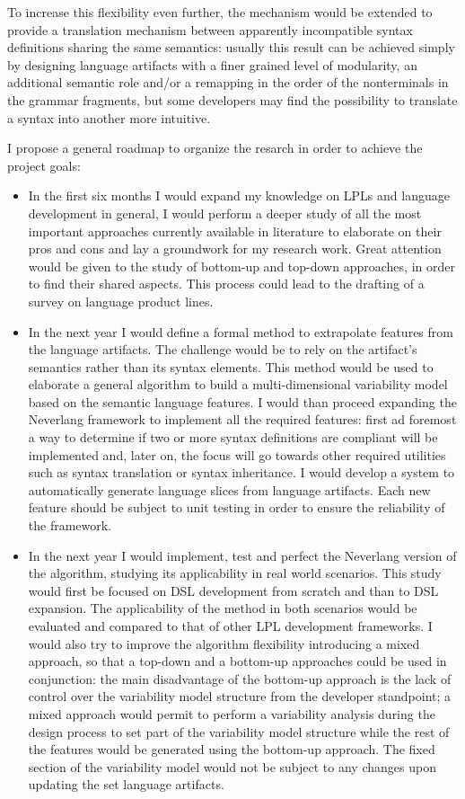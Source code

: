 To increase this flexibility even further, the mechanism would be extended to provide a translation mechanism between apparently incompatible syntax definitions sharing the same semantics: usually this result can be achieved simply by designing language artifacts with a finer grained level of modularity, an additional semantic role and/or a remapping in the order of the nonterminals in the grammar fragments, but some developers may find the possibility to translate a syntax into another more intuitive.

I propose a general roadmap to organize the resarch in order to achieve the project goals:
\begin{itemize}
    \item In the first six months I would expand my knowledge on LPLs and language development in general, I would perform a deeper study of all the most important approaches currently available in literature to elaborate on their pros and cons and lay a groundwork for my research work. Great attention would be given to the study of bottom-up and top-down approaches, in order to find their shared aspects. This process could lead to the drafting of a survey on language product lines.
    \item In the next year I would define a formal method to extrapolate features from the language artifacts. The challenge would be to rely on the artifact's semantics rather than its syntax elements. This method would be used to elaborate a general algorithm to build a multi-dimensional variability model based on the semantic language features. I would than proceed expanding the Neverlang framework to implement all the required features: first ad foremost a way to determine if two or more syntax definitions are compliant will be implemented and, later on, the focus will go towards other required utilities such as syntax translation or syntax inheritance. I would develop a system to automatically generate language slices from language artifacts. Each new feature should be subject to unit testing in order to ensure the reliability of the framework.
    \item In the next year I would implement, test and perfect the Neverlang version of the algorithm, studying its applicability in real world scenarios. This study would first be focused on DSL development from scratch and than to DSL expansion. The applicability of the method in both scenarios would be evaluated and compared to that of other LPL development frameworks. I would also try to improve the algorithm flexibility introducing a mixed approach, so that a top-down and a bottom-up approaches could be used in conjunction: the main disadvantage of the bottom-up approach is the lack of control over the variability model structure from the developer standpoint; a mixed approach would permit to perform a variability analysis during the design process to set part of the variability model structure while the rest of the features would be generated using the bottom-up approach. The fixed section of the variability model would not be subject to any changes upon updating the set language artifacts.

\end{itemize}
